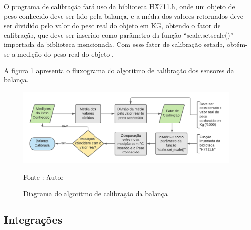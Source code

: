 O programa de calibração fará uso da biblioteca \href{https://github.com/bogde/HX711}{HX711.h}, onde um objeto de peso conhecido deve ser lido pela balança, e a média dos valores retornados deve ser dividido pelo valor do peso real do objeto em KG, obtendo o fator de calibração, que deve ser inserido como parâmetro da função “scale.set\textunderscore scale()” importada da biblioteca mencionada. Com esse fator de calibração setado, obtém-se a medição do peso real do objeto \cite{CALIBRACAO_tutorial}.

A figura \ref{fig:Calibracao_balanca} apresenta o fluxograma do algoritmo de calibração dos sensores da balança.

\begin{figure}[H]
  \centering
  \includegraphics[scale=0.6]{figuras/Algoritmo de Calibração da Balança.png}
  \caption{Diagrama do algoritmo de calibração da balança } 
  {\footnotesize Fonte : Autor } 
  \label{fig:Calibracao_balanca}
\end{figure}


\subsection{Integrações}
